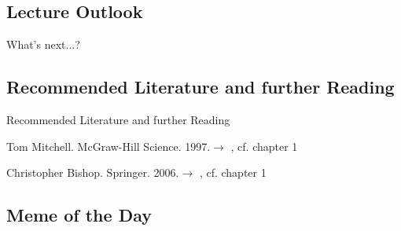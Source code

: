 \subsection{Lecture Outlook}

\begin{frame}{What's next...?}{}
\end{frame}


\subsection{Recommended Literature and further Reading}

\begin{frame}[allowframebreaks]{Recommended Literature and further Reading}{}
	\footnotesize
	\begin{thebibliography}{2}
			{Tom Mitchell. McGraw-Hill Science. 1997.}{$\rightarrow$ \href{
				https://www.cs.ubbcluj.ro/~gabis/ml/ml-books/McGrawHill\%20-\%20Machine\%20Learning\%20-Tom\%20Mitchell.pdf
			}{}, cf. chapter 1}

			{Christopher Bishop. Springer. 2006.}{$\rightarrow$ \href{
				http://users.isr.ist.utl.pt/~wurmd/Livros/school/Bishop\%20-\%20Pattern\%20Recognition\%20And\%20Machine\%20Learning\%20-\%20Springer\%20\%202006.pdf
			}{}, cf. chapter 1}
	\end{thebibliography}
\end{frame}


\subsection{Meme of the Day}

